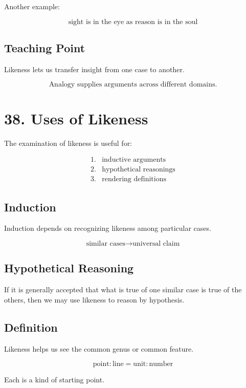 \documentclass[12pt]{article}
\begin{document}
Another example:

\[
\text{sight is in the eye as reason is in the soul}
\]

\subsection*{Teaching Point}

Likeness lets us transfer insight from one case to another.

\[
\boxed{
\text{Analogy supplies arguments across different domains.}
}
\]

\section*{38. Uses of Likeness}

The examination of likeness is useful for:

\[
\begin{array}{ll}
1. & \text{inductive arguments} \\
2. & \text{hypothetical reasonings} \\
3. & \text{rendering definitions}
\end{array}
\]

\subsection*{Induction}

Induction depends on recognizing likeness among particular cases.

\[
\text{similar cases} \rightarrow \text{universal claim}
\]

\subsection*{Hypothetical Reasoning}

If it is generally accepted that what is true of one similar case is true of the
others, then we may use likeness to reason by hypothesis.

\subsection*{Definition}

Likeness helps us see the common genus or common feature.

\[
\text{point} : \text{line}
=
\text{unit} : \text{number}
\]

Each is a kind of starting point.
\end{document}
